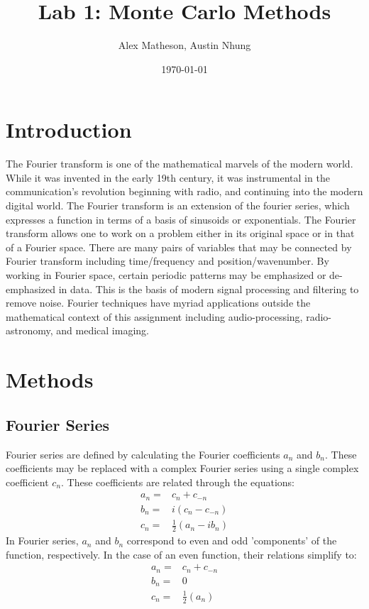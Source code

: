 \documentclass[twocolumn]{article}
\begin{document}
\title{Lab 1: Monte Carlo Methods}
\author{Alex Matheson, Austin Nhung}
\date{\today}
\maketitle

\section{Introduction}
The Fourier transform is one of the mathematical marvels of the modern world. While it was invented in the early 19th century, it was instrumental in the communication's revolution beginning with radio, and continuing into the modern digital world. The Fourier transform is an extension of the fourier series, which expresses a function in terms of a basis of sinusoids or exponentials. The Fourier transform allows one to work on a problem either in its original space or in that of a Fourier space. There are many pairs of variables that may be connected by Fourier transform including time/frequency and position/wavenumber. By working in Fourier space, certain periodic patterns may be emphasized or de-emphasized in data. This is the basis of modern signal processing and filtering to remove noise. Fourier techniques have myriad applications outside the mathematical context of this assignment including audio-processing, radio-astronomy, and medical imaging.

\section{Methods}
\subsection{Fourier Series}
Fourier series are defined by calculating the Fourier coefficients $a_n$ and
$b_n$. These coefficients may be replaced with a complex Fourier series using
a single complex coefficient $c_n$. These coefficients are related through the
equations:
\begin{equation}
	\begin{split}
		a_n =& c_n + c_{-n} \\
		b_n =& i(c_n - c_{-n}) \\
		c_n =& \frac{1}{2}(a_n - ib_n)
	\end{split}
\end{equation}
In Fourier series, $a_n$ and $b_n$ correspond to even and odd 'components' of
the function, respectively. In the case of an even function, their relations
simplify to:
\begin{equation}
	\begin{split}
		a_n =& c_n + c_{-n} \\
		b_n =& 0 \\
		c_n =& \frac{1}{2}(a_n)
	\end{split}
\end{equation}
\end{document}
